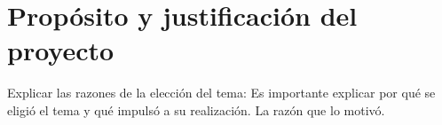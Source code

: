 \section{Propósito y justificación del proyecto}

Explicar las razones de la elección del tema:
Es importante explicar por qué se eligió el tema y qué impulsó a su realización. La razón que lo motivó.